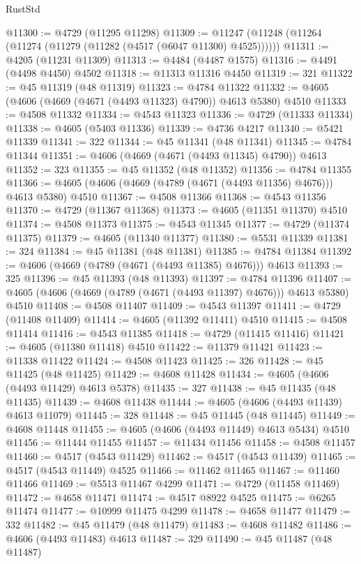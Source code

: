 \begin{lexlean}{RustStd}
\begin{coremodule}
@11300 := @4729 (@11295 @11298)
@11309 := @11247 (@11248 (@11264 (@11274 (@11279 (@11282 (@4517 (@6047 @11300) @4525))))))
@11311 := @4205 (@11231 @11309)
@11313 := @4484 (@4487 @1575)
@11316 := @4491 (@4498 @4450) @4502
@11318 := @11313 @11316 @4450
@11319 := 321
@11322 := @45 @11319 (@48 @11319)
@11323 := @4784 @11322
@11332 := @4605 (@4606 (@4669 (@4671 (@4493 @11323) @4790)) @4613 @5380) @4510
@11333 := @4508 @11332
@11334 := @4543 @11323
@11336 := @4729 (@11333 @11334)
@11338 := @4605 (@5403 @11336)
@11339 := @4736 @4217
@11340 := @5421 @11339
@11341 := 322
@11344 := @45 @11341 (@48 @11341)
@11345 := @4784 @11344
@11351 := @4606 (@4669 (@4671 (@4493 @11345) @4790)) @4613
@11352 := 323
@11355 := @45 @11352 (@48 @11352)
@11356 := @4784 @11355
@11366 := @4605 (@4606 (@4669 (@4789 (@4671 (@4493 @11356) @4676))) @4613 @5380) @4510
@11367 := @4508 @11366
@11368 := @4543 @11356
@11370 := @4729 (@11367 @11368)
@11373 := @4605 (@11351 @11370) @4510
@11374 := @4508 @11373
@11375 := @4543 @11345
@11377 := @4729 (@11374 @11375)
@11379 := @4605 (@11340 @11377)
@11380 := @5531 @11339
@11381 := 324
@11384 := @45 @11381 (@48 @11381)
@11385 := @4784 @11384
@11392 := @4606 (@4669 (@4789 (@4671 (@4493 @11385) @4676))) @4613
@11393 := 325
@11396 := @45 @11393 (@48 @11393)
@11397 := @4784 @11396
@11407 := @4605 (@4606 (@4669 (@4789 (@4671 (@4493 @11397) @4676))) @4613 @5380) @4510
@11408 := @4508 @11407
@11409 := @4543 @11397
@11411 := @4729 (@11408 @11409)
@11414 := @4605 (@11392 @11411) @4510
@11415 := @4508 @11414
@11416 := @4543 @11385
@11418 := @4729 (@11415 @11416)
@11421 := @4605 (@11380 @11418) @4510
@11422 := @11379 @11421
@11423 := @11338 @11422
@11424 := @4508 @11423
@11425 := 326
@11428 := @45 @11425 (@48 @11425)
@11429 := @4608 @11428
@11434 := @4605 (@4606 (@4493 @11429) @4613 @5378)
@11435 := 327
@11438 := @45 @11435 (@48 @11435)
@11439 := @4608 @11438
@11444 := @4605 (@4606 (@4493 @11439) @4613 @11079)
@11445 := 328
@11448 := @45 @11445 (@48 @11445)
@11449 := @4608 @11448
@11455 := @4605 (@4606 (@4493 @11449) @4613 @5434) @4510
@11456 := @11444 @11455
@11457 := @11434 @11456
@11458 := @4508 @11457
@11460 := @4517 (@4543 @11429)
@11462 := @4517 (@4543 @11439)
@11465 := @4517 (@4543 @11449) @4525
@11466 := @11462 @11465
@11467 := @11460 @11466
@11469 := @5513 @11467 @4299
@11471 := @4729 (@11458 @11469)
@11472 := @4658 @11471
@11474 := @4517 @8922 @4525
@11475 := @6265 @11474
@11477 := @10999 @11475 @4299
@11478 := @4658 @11477
@11479 := 332
@11482 := @45 @11479 (@48 @11479)
@11483 := @4608 @11482
@11486 := @4606 (@4493 @11483) @4613
@11487 := 329
@11490 := @45 @11487 (@48 @11487)

\end{coremodule}
\end{lexlean}
